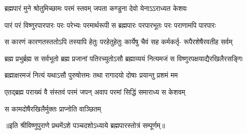 

\addtocounter{shlokacount}{53}

\twolineshloka
{ब्रह्मपारं मुने श्रोतुमिच्छामः परमं स्तवम्}
{जपता कण्डुना देवो येनाऽऽराध्यत केशवः} %

\fourlineindentedshloka
{पारं परं विष्णुरपारपारः}
{परः परेभ्यः परमार्थरूपी}
{स ब्रह्मपारः परपारभूतः}
{परः पराणामपि पारपारः} %

\fourlineindentedshloka
{स कारणं कारणतस्ततोऽपि}
{तस्यापि हेतुः परहेतुहेतुः}
{कार्येषु चैवं सह कर्मकर्तृ-}
{रूपैरशेषैरवतीह सर्वम्} %

\fourlineindentedshloka
{ब्रह्म प्रभुर्ब्रह्म स सर्वभूतो}
{ब्रह्म प्रजानां पतिरच्युतोऽसौ} 
{ब्रह्माव्ययं नित्यमजं स}
{विष्णुरपक्षयाद्यैरखिलैरसङ्गिः} %

\twolineshloka
{ब्रह्माक्षरमजं नित्यं यथाऽसौ पुरुषोत्तमः}
{तथा रागादयो दोषाः प्रयान्तु प्रशमं मम} %


\twolineshloka
{एतद्ब्रह्म पराख्यं वै संस्तवं परमं जपन्}
{अवाप परमां सिद्धिं समाराध्य स केशवम्} %

{स कामदोषैरखिलैर्मुक्तः प्राप्नोति वाञ्छितम्} %

॥इति श्रीविष्णुपुराणे प्रथमेंऽशे पञ्चदशोऽध्याये ब्रह्मपारस्तोत्रं सम्पूर्णम्॥ 